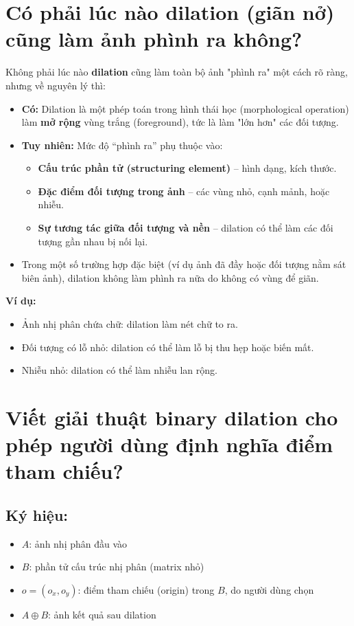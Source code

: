 \documentclass[12pt]{article}
\begin{document}
	\section{Có phải lúc nào dilation (giãn nở) cũng làm ảnh phình ra không?}
	
	Không phải lúc nào \textbf{dilation} cũng làm toàn bộ ảnh "phình ra" một cách rõ ràng, nhưng về nguyên lý thì:
	
	\begin{itemize}
	\item \textbf{Có:} Dilation là một phép toán trong hình thái học (morphological operation) làm \textbf{mở rộng} vùng trắng (foreground), tức là làm "lớn hơn" các đối tượng.
	\item \textbf{Tuy nhiên:} Mức độ “phình ra” phụ thuộc vào:
	\begin{itemize}
	\item \textbf{Cấu trúc phần tử (structuring element)} – hình dạng, kích thước.
	\item \textbf{Đặc điểm đối tượng trong ảnh} – các vùng nhỏ, cạnh mảnh, hoặc nhiễu.
	\item \textbf{Sự tương tác giữa đối tượng và nền} – dilation có thể làm các đối tượng gần nhau bị nối lại.
	\end{itemize}
	\item Trong một số trường hợp đặc biệt (ví dụ ảnh đã đầy hoặc đối tượng nằm sát biên ảnh), dilation không làm phình ra nữa do không có vùng để giãn.
	\end{itemize}
	
	\textbf{Ví dụ:}
	\begin{itemize}
	\item Ảnh nhị phân chứa chữ: dilation làm nét chữ to ra.
	\item Đối tượng có lỗ nhỏ: dilation có thể làm lỗ bị thu hẹp hoặc biến mất.
	\item Nhiễu nhỏ: dilation có thể làm nhiễu lan rộng.
	\end{itemize}
	
	\section{Viết giải thuật binary dilation cho phép người dùng định nghĩa điểm tham chiếu?}
	
	\subsection*{Ký hiệu:}
	\begin{itemize}
	\item $A$: ảnh nhị phân đầu vào
	\item $B$: phần tử cấu trúc nhị phân (matrix nhỏ)
	\item $o = (o_x, o_y)$: điểm tham chiếu (origin) trong $B$, do người dùng chọn
	\item $A \oplus B$: ảnh kết quả sau dilation
	\end{itemize}
	
\end{document}
